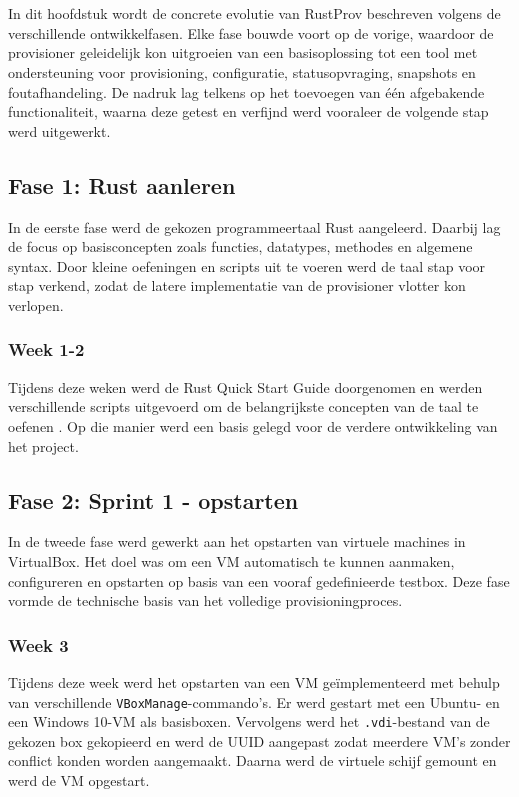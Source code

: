 \chapter{}%
\label{ch:iteratieve-uitwerking}

In dit hoofdstuk wordt de concrete evolutie van RustProv beschreven volgens de verschillende ontwikkelfasen. Elke fase bouwde voort op de vorige, waardoor de provisioner geleidelijk kon uitgroeien van een basisoplossing tot een tool met ondersteuning voor provisioning, configuratie, statusopvraging, snapshots en foutafhandeling. De nadruk lag telkens op het toevoegen van één afgebakende functionaliteit, waarna deze getest en verfijnd werd vooraleer de volgende stap werd uitgewerkt.

\section{Fase 1: Rust aanleren}
In de eerste fase werd de gekozen programmeertaal Rust aangeleerd. Daarbij lag de focus op basisconcepten zoals functies, datatypes, methodes en algemene syntax. Door kleine oefeningen en scripts uit te voeren werd de taal stap voor stap verkend, zodat de latere implementatie van de provisioner vlotter kon verlopen.

\subsection{Week 1-2}
Tijdens deze weken werd de Rust Quick Start Guide doorgenomen en werden verschillende scripts uitgevoerd om de belangrijkste concepten van de taal te oefenen \autocite{Arbuckle2018}. Op die manier werd een basis gelegd voor de verdere ontwikkeling van het project.

\section{Fase 2: Sprint 1 - opstarten}
In de tweede fase werd gewerkt aan het opstarten van virtuele machines in VirtualBox. Het doel was om een VM automatisch te kunnen aanmaken, configureren en opstarten op basis van een vooraf gedefinieerde testbox. Deze fase vormde de technische basis van het volledige provisioningproces.

\subsection{Week 3}
Tijdens deze week werd het opstarten van een VM geïmplementeerd met behulp van verschillende \texttt{VBoxManage}-commando's. Er werd gestart met een Ubuntu- en een Windows 10-VM als basisboxen. Vervolgens werd het \texttt{.vdi}-bestand van de gekozen box gekopieerd en werd de UUID aangepast zodat meerdere VM's zonder conflict konden worden aangemaakt. Daarna werd de virtuele schijf gemount en werd de VM opgestart.


